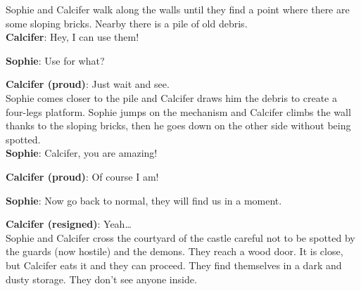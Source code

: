 
\noindent Sophie and Calcifer walk along the walls until they find a point where there are some sloping bricks.
Nearby there is a pile of old debris.\\

\textbf{Calcifer}: Hey, I can use them!

\textbf{Sophie}: Use for what?

\textbf{Calcifer (proud)}: Just wait and see.\\

\noindent Sophie comes closer to the pile and Calcifer draws him the debris to create a four-legs platform.
Sophie jumps on the mechanism and Calcifer climbs the wall thanks to the sloping bricks, then he goes down on the other side without being spotted.\\

\textbf{Sophie}: Calcifer, you are amazing!

\textbf{Calcifer (proud)}: Of course I am!

\textbf{Sophie}: Now go back to normal, they will find us in a moment.

\textbf{Calcifer (resigned)}: Yeah…\\

\noindent Sophie and Calcifer cross the courtyard of the castle careful not to be spotted by the guards (now hostile) and the demons.
They reach a wood door. It is close, but Calcifer eats it and they can proceed. They find themselves in a dark and dusty storage. They don’t see anyone inside.\\

